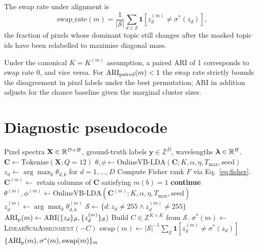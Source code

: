 \documentclass[11pt,a4paper]{article}
\begin{document}
The swap rate under alignment is
\begin{equation}
\mathrm{swap\_rate}(m) =
\frac{1}{|\mathcal{S}|} \sum_{d \in \mathcal{S}}
\mathbf{1}[z^{(m)}_d \neq \sigma^*(z_d)],
\end{equation}
the fraction of pixels whose dominant topic still changes after the
masked topic ids have been relabelled to maximise diagonal mass.

\begin{proposition}
Under the canonical $K = K^{(m)}$ assumption, a paired ARI of 1
corresponds to swap rate 0, and vice versa. For
$\mathrm{ARI}_{\text{paired}}(m) < 1$ the swap rate strictly bounds the
disagreement in pixel labels under the best permutation; ARI in
addition adjusts for the chance baseline given the marginal cluster
sizes.
\end{proposition}

\section{Diagnostic pseudocode}

\begin{algorithm}
\caption{Band-mask robustness diagnostic}\label{alg:diag}
\begin{algorithmic}[1]
\Require Pixel spectra $\mathbf{X} \in \mathbb{R}^{D \times B}$, ground-truth
labels $\mathbf{y} \in \mathbb{Z}^D$, wavelengths $\boldsymbol{\lambda}
\in \mathbb{R}^B$.
\State $\mathbf{C} \gets \text{Tokenise}(\mathbf{X}; Q=12)$
\State $\theta, \phi \gets \text{OnlineVB-LDA}(\mathbf{C}; K, \alpha,
\eta, T_{\max}, \mathrm{seed})$
\State $z_d \gets \arg\max_k \theta_{d,k}$ for $d = 1, \ldots, D$
\State Compute Fisher rank $F$ via Eq.~\ref{eq:fisher}.
  \State $\mathbf{C}^{(m)} \gets$ retain columns of $\mathbf{C}$
  satisfying $m(b) = 1$
   \State \textbf{continue}
  \EndIf
  \State $\theta^{(m)}, \phi^{(m)} \gets \text{OnlineVB-LDA}
  (\mathbf{C}^{(m)}; K, \alpha, \eta, T_{\max}, \mathrm{seed})$
  \State $z^{(m)}_d \gets \arg\max_k \theta^{(m)}_{d,k}$
  \State $\mathcal{S} \gets \{d : z_d \ne 255 \wedge z^{(m)}_d \ne 255\}$
  \State $\mathrm{ARI}_{\text{p}}(m) \gets \mathrm{ARI}(\{z_d\}_\mathcal{S},
  \{z^{(m)}_d\}_\mathcal{S})$
  \State Build $C \in \mathbb{Z}^{K \times K}$ from $\mathcal{S}$.
  \State $\sigma^*(m) \gets$ \textsc{LinearSumAssignment}$(-C)$
  \State $\mathrm{swap}(m) \gets |\mathcal{S}|^{-1}
  \sum_\mathcal{S} \mathbf{1}[z^{(m)}_d \ne \sigma^*(z_d)]$
\EndFor
\State \Return $\{\mathrm{ARI}_{\text{p}}(m), \sigma^*(m), \mathrm{swap}(m)\}_m$
\end{algorithmic}
\end{algorithm}
\end{document}
